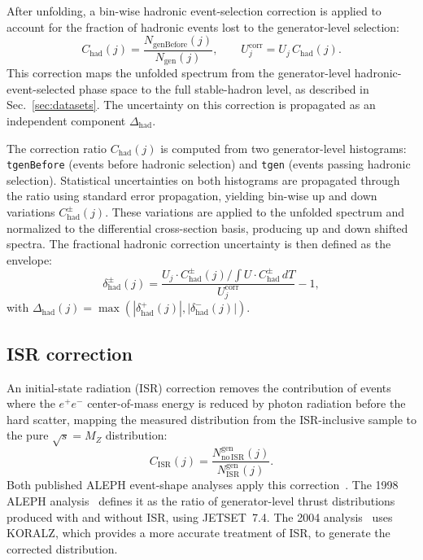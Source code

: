 After unfolding, a bin-wise hadronic event-selection correction is applied to
account for the fraction of hadronic events lost to the generator-level selection:
\begin{equation}
C_{\mathrm{had}}(j) = \frac{N_{\mathrm{genBefore}}(j)}{N_{\mathrm{gen}}(j)},
\qquad
U_j^{\mathrm{corr}} = U_j\,C_{\mathrm{had}}(j).
\end{equation}
This correction maps the unfolded spectrum from the generator-level hadronic-event-selected
phase space to the full stable-hadron level, as described in Sec.~\ref{sec:datasets}.
The uncertainty on this correction is propagated as an independent component
$\Delta_{\mathrm{had}}$.

The correction ratio $C_{\mathrm{had}}(j)$ is computed from two generator-level
histograms: \texttt{tgenBefore} (events before hadronic selection) and \texttt{tgen}
(events passing hadronic selection). Statistical uncertainties on both histograms are
propagated through the ratio using standard error propagation, yielding bin-wise up and
down variations $C_{\mathrm{had}}^{\pm}(j)$. These variations are applied to the
unfolded spectrum and normalized to the differential cross-section basis, producing
up and down shifted spectra. The fractional hadronic correction uncertainty is then
defined as the envelope:
\begin{equation}
\delta_{\mathrm{had}}^{\pm}(j) = \frac{U_j \cdot C_{\mathrm{had}}^{\pm}(j) / \int U \cdot C_{\mathrm{had}}^{\pm}\,dT}{U_j^{\mathrm{corr}}} - 1,
\end{equation}
with $\Delta_{\mathrm{had}}(j) = \max(|\delta_{\mathrm{had}}^{+}(j)|, |\delta_{\mathrm{had}}^{-}(j)|)$.

\subsection{ISR correction}
\label{sec:isr_uncertainty}

An initial-state radiation (ISR) correction removes the contribution of events
where the $e^+e^-$ center-of-mass energy is reduced by photon radiation before
the hard scatter, mapping the measured distribution from the ISR-inclusive sample
to the pure $\sqrt{s}=M_Z$ distribution:
\begin{equation}
C_{\mathrm{ISR}}(j) = \frac{N^{\mathrm{gen}}_{\mathrm{no\,ISR}}(j)}{N^{\mathrm{gen}}_{\mathrm{ISR}}(j)}.
\end{equation}
Both published ALEPH event-shape analyses apply this
correction~\cite{Barate:1996fi,Heister:2003aj}. The 1998 ALEPH
analysis~\cite{Barate:1996fi} defines it as the ratio of generator-level thrust
distributions produced with and without ISR, using JETSET~7.4. The 2004
analysis~\cite{Heister:2003aj} uses KORALZ, which provides a more accurate
treatment of ISR, to generate the corrected distribution.

